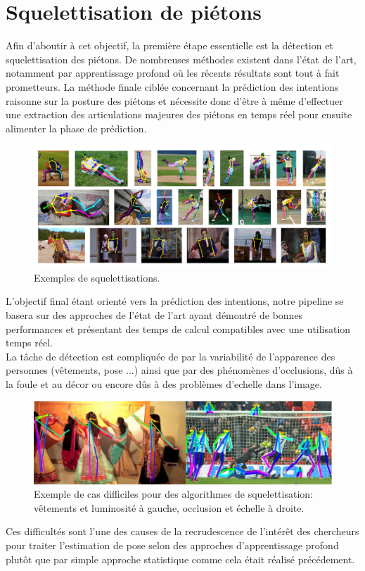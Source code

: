 \section{Squelettisation de piétons}

Afin d’aboutir à cet objectif, la première étape essentielle est la détection et squelettisation des piétons. De nombreuses méthodes existent dans l’état de l’art, notamment par apprentissage profond où les récents résultats sont tout à fait prometteurs. La méthode finale ciblée concernant la prédiction des intentions raisonne sur la posture des piétons et nécessite donc d’être à même d’effectuer une extraction des articulations majeures des piétons en temps réel pour ensuite alimenter la phase de prédiction.


\begin{figure}[H]
    \centering
    \includegraphics[width=0.9\linewidth]{Images/pose_estim_example.png}
    \caption{Exemples de squelettisations.}
    \label{fig:difficulte}
\end{figure}

L’objectif final étant orienté vers la prédiction des intentions, notre pipeline se basera sur des approches de l’état de l’art ayant démontré de bonnes performances et présentant des temps de calcul compatibles avec une utilisation temps réel.\\

La tâche de détection est compliquée de par la variabilité de l’apparence des personnes (vêtements, pose ...)
ainsi que par des phénomènes d’occlusions, dûs à la foule et au décor ou encore dûs à des problèmes d'echelle dans l'image.\\


\begin{figure}[H]
    \centering
    \includegraphics[width=0.85\linewidth]{Images/Difficulties.png}
    \caption{Exemple de cas difficiles pour des algorithmes de squelettisation: vêtements et luminosité à gauche, occlusion et échelle à droite.}
    \label{fig:difficulte}
\end{figure}
Ces difficultés sont l'une des causes de la recrudescence de l'intérêt des chercheurs pour traiter l'estimation de pose selon des approches d'apprentissage profond plutôt que par simple approche statistique comme cela était réalisé précédement.\\

